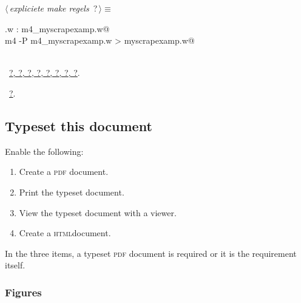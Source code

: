 \documentclass[twoside]{artikel3}
\newcommand{\pdf}{\textsc{pdf}}
\newcommand{\HTML}{\textsc{html}}
\renewcommand{\NWlink}[2]{\hyperlink{#1}{#2}}
\renewcommand{\NWtarget}[2]{\hypertarget{#1}{#2}}
\renewcommand{\NWsep}{$\diamond$\rule[-1\baselineskip]{0pt}{1\baselineskip}}
\renewcommand{\NWlink}[2]{\hyperlink{#1}{#2}}
\renewcommand{\NWtarget}[2]{\hypertarget{#1}{#2}}
\begin{document}
\begin{flushleft} \small
\begin{minipage}{\linewidth}\label{scrap12}\raggedright\small
\NWtarget{nuweb?}{} $\langle\,${\itshape expliciete make regels}\nobreak\ {\footnotesize {?}}$\,\rangle\equiv$
\vspace{-1ex}
\begin{list}{}{} \item
\mbox{}\verb@myscrapexamp.w : m4_myscrapexamp.w@\\
\mbox{}\verb@        m4 -P m4_myscrapexamp.w > myscrapexamp.w@\\
\mbox{}\verb@@\\
\mbox{}\verb@@{\NWsep}
\end{list}
\vspace{-1.5ex}
\footnotesize
\begin{list}{}{\setlength{\itemsep}{-\parsep}\setlength{\itemindent}{-\leftmargin}}
\item \NWtxtMacroDefBy\ \NWlink{nuweb?}{?}\NWlink{nuweb?}{, ?}\NWlink{nuweb?}{, ?}\NWlink{nuweb?}{, ?}\NWlink{nuweb?}{, ?}\NWlink{nuweb?}{, ?}\NWlink{nuweb?}{, ?}\NWlink{nuweb?}{, ?}.
\item \NWtxtMacroRefIn\ \NWlink{nuweb?}{?}.

\item{}
\end{list}
\end{minipage}\vspace{4ex}
\end{flushleft}
\subsection{Typeset this document}
\label{sec:typeset}

Enable the following:
\begin{enumerate}
\item Create a \pdf{} document.
\item Print the typeset document.
\item View the typeset document with a viewer.
\item Create a \HTML document.
\end{enumerate}

In the three items, a typeset \pdf{} document is required or it is the
requirement itself.




\subsubsection{Figures}
\label{sec:figures}
\end{document}
